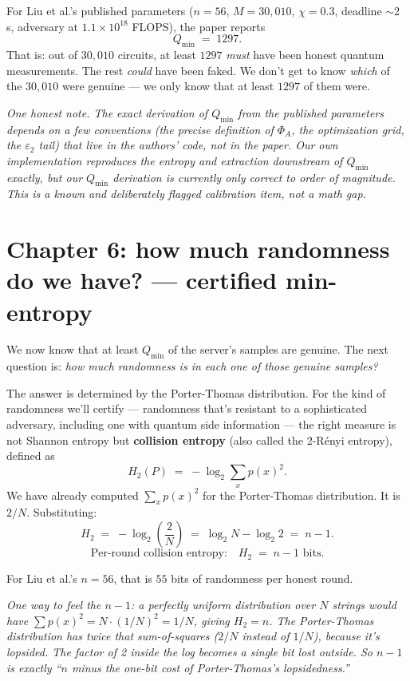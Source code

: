 \documentclass[11pt]{article}
\newenvironment{aside}{\par\medskip\noindent\itshape\small\color{black!70}}{\normalfont\par\medskip}
\newcommand{\formula}[1]{\[\boxed{#1}\]}
\newcommand{\Qmin}{Q_{\min}}
\newcommand{\Phia}{\Phi_{\!A}}
\newcommand{\eps}{\varepsilon}
\begin{document}
For Liu et al.'s published parameters ($n=56$, $M=30{,}010$, $\chi=0.3$, deadline $\sim$2 s, adversary at $1.1\times 10^{18}$ FLOPS), the paper reports
\[
\Qmin \;=\; 1297.
\]
That is: out of $30{,}010$ circuits, at least $1297$ \emph{must} have been honest quantum measurements. The rest \emph{could} have been faked. We don't get to know \emph{which} of the $30{,}010$ were genuine --- we only know that at least $1297$ of them were.

\begin{aside}
One honest note. The exact derivation of $\Qmin$ from the published parameters depends on a few conventions (the precise definition of $\Phia$, the optimization grid, the $\eps_2$ tail) that live in the authors' code, not in the paper. Our own implementation reproduces the entropy and extraction \emph{downstream} of $\Qmin$ exactly, but our $\Qmin$ derivation is currently only correct to order of magnitude. This is a known and deliberately flagged calibration item, not a math gap.
\end{aside}

\section{Chapter 6: how much randomness do we have? --- certified min-entropy}

We now know that at least $\Qmin$ of the server's samples are genuine. The next question is: \emph{how much randomness is in each one of those genuine samples?}

The answer is determined by the Porter-Thomas distribution. For the kind of randomness we'll certify --- randomness that's resistant to a sophisticated adversary, including one with quantum side information --- the right measure is not Shannon entropy but \textbf{collision entropy} (also called the 2-R\'enyi entropy), defined as
\[
H_2(P) \;=\; -\log_2 \sum_x p(x)^2.
\]
We have already computed $\sum_x p(x)^2$ for the Porter-Thomas distribution. It is $2/N$. Substituting:
\[
H_2 \;=\; -\log_2\!\left(\frac{2}{N}\right) \;=\; \log_2 N - \log_2 2 \;=\; n - 1.
\]
\formula{\text{Per-round collision entropy:} \quad H_2 \;=\; n - 1 \text{ bits.}}

\noindent For Liu et al.'s $n=56$, that is $55$ bits of randomness per honest round.

\begin{aside}
One way to feel the $n-1$: a perfectly uniform distribution over $N$ strings would have $\sum p(x)^2 = N \cdot (1/N)^2 = 1/N$, giving $H_2 = n$. The Porter-Thomas distribution has \emph{twice} that sum-of-squares ($2/N$ instead of $1/N$), because it's lopsided. The factor of 2 inside the log becomes a single bit lost outside. So $n-1$ is exactly ``$n$ minus the one-bit cost of Porter-Thomas's lopsidedness.''
\end{aside}
\end{document}
